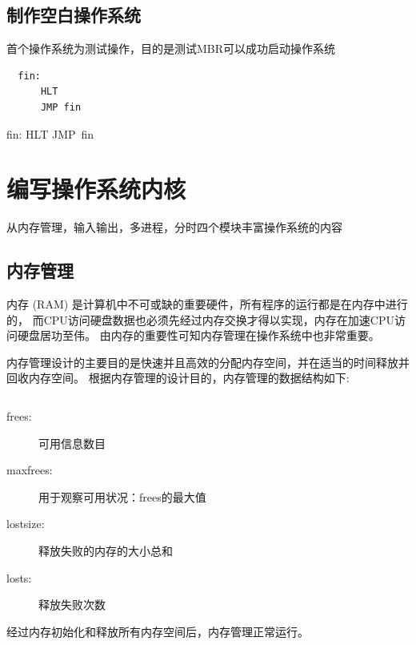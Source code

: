 \documentclass{swfcthesis}
\begin{document}
\begin{listing}[H]
  \inputminted[tabsize=2, firstline=125, lastline=147,
  linenos=true]{nasm}{../ZOS/src/kernel/ipl09.nas}
\end{listing}

\section{制作空白操作系统}

首个操作系统为测试操作，目的是测试MBR可以成功启动操作系统

\begin{verbatim}
  fin:
      HLT
      JMP fin
\end{verbatim}

\begin{listing}[H]
  fin:
  HLT
  JMP fin
\end{listing}

\chapter{编写操作系统内核}

从内存管理，输入输出，多进程，分时四个模块丰富操作系统的内容

\section{内存管理}

内存 (RAM) 是计算机中不可或缺的重要硬件，所有程序的运行都是在内存中进行的，
而CPU访问硬盘数据也必须先经过内存交换才得以实现，内存在加速CPU访问硬盘居功至伟。
由内存的重要性可知内存管理在操作系统中也非常重要。	

内存管理设计的主要目的是快速并且高效的分配内存空间，并在适当的时间释放并回收内存空间。
根据内存管理的设计目的，内存管理的数据结构如下:

\inputminted[tabsize=2, firstline=137, lastline=143,
linenos=true]{c}{../ZOS/src/kernel/bootpack.h}

\begin{description}
\item[frees:]可用信息数目
\item[maxfrees:]用于观察可用状况：frees的最大值
\item[lostsize:]释放失败的内存的大小总和
\item[losts:]释放失败次数
\end{description}

经过内存初始化和释放所有内存空间后，内存管理正常运行。
\end{document}
